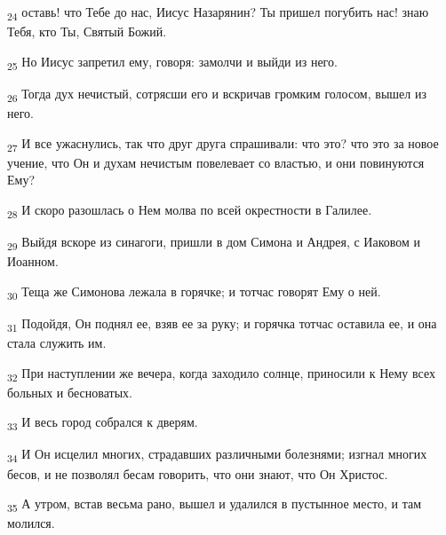 \begin{tcolorbox}
\textsubscript{24} оставь! что Тебе до нас, Иисус Назарянин? Ты пришел погубить нас! знаю Тебя, кто Ты, Святый Божий.
\end{tcolorbox}
\begin{tcolorbox}
\textsubscript{25} Но Иисус запретил ему, говоря: замолчи и выйди из него.
\end{tcolorbox}
\begin{tcolorbox}
\textsubscript{26} Тогда дух нечистый, сотрясши его и вскричав громким голосом, вышел из него.
\end{tcolorbox}
\begin{tcolorbox}
\textsubscript{27} И все ужаснулись, так что друг друга спрашивали: что это? что это за новое учение, что Он и духам нечистым повелевает со властью, и они повинуются Ему?
\end{tcolorbox}
\begin{tcolorbox}
\textsubscript{28} И скоро разошлась о Нем молва по всей окрестности в Галилее.
\end{tcolorbox}
\begin{tcolorbox}
\textsubscript{29} Выйдя вскоре из синагоги, пришли в дом Симона и Андрея, с Иаковом и Иоанном.
\end{tcolorbox}
\begin{tcolorbox}
\textsubscript{30} Теща же Симонова лежала в горячке; и тотчас говорят Ему о ней.
\end{tcolorbox}
\begin{tcolorbox}
\textsubscript{31} Подойдя, Он поднял ее, взяв ее за руку; и горячка тотчас оставила ее, и она стала служить им.
\end{tcolorbox}
\begin{tcolorbox}
\textsubscript{32} При наступлении же вечера, когда заходило солнце, приносили к Нему всех больных и бесноватых.
\end{tcolorbox}
\begin{tcolorbox}
\textsubscript{33} И весь город собрался к дверям.
\end{tcolorbox}
\begin{tcolorbox}
\textsubscript{34} И Он исцелил многих, страдавших различными болезнями; изгнал многих бесов, и не позволял бесам говорить, что они знают, что Он Христос.
\end{tcolorbox}
\begin{tcolorbox}
\textsubscript{35} А утром, встав весьма рано, вышел и удалился в пустынное место, и там молился.
\end{tcolorbox}
